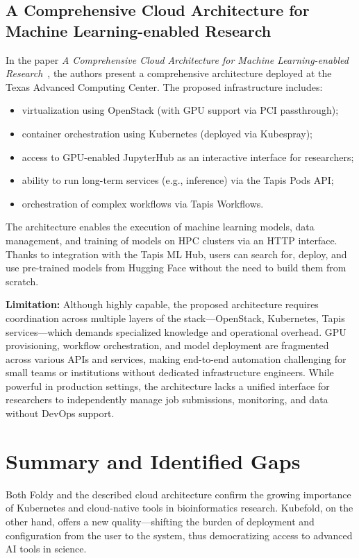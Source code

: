 \subsection{A Comprehensive Cloud Architecture for Machine Learning-enabled Research}

In the paper \textit{A Comprehensive Cloud Architecture for Machine Learning-enabled Research}~\cite{cloud_architecture_for_research}, the authors present a comprehensive architecture deployed at the Texas Advanced Computing Center.
The proposed infrastructure includes:
\begin{itemize}
    \item virtualization using OpenStack (with GPU support via PCI passthrough);
    \item container orchestration using Kubernetes (deployed via Kubespray);
    \item access to GPU-enabled JupyterHub as an interactive interface for researchers;
    \item ability to run long-term services (e.g., inference) via the Tapis Pods API;
    \item orchestration of complex workflows via Tapis Workflows.
\end{itemize}

The architecture enables the execution of machine learning models, data management, and training of models on HPC clusters via an HTTP interface.
Thanks to integration with the Tapis ML Hub, users can search for, deploy, and use pre-trained models from Hugging Face without the need to build them from scratch.

\textbf{Limitation:} Although highly capable, the proposed architecture requires coordination across multiple layers of the stack—OpenStack, Kubernetes, Tapis services—which demands specialized knowledge and operational overhead.
GPU provisioning, workflow orchestration, and model deployment are fragmented across various APIs and services, making end-to-end automation challenging for small teams or institutions without dedicated infrastructure engineers.
While powerful in production settings, the architecture lacks a unified interface for researchers to independently manage job submissions, monitoring, and data without DevOps support.


\section{Summary and Identified Gaps}

Both Foldy and the described cloud architecture confirm the growing importance of Kubernetes and cloud-native tools in bioinformatics research.
Kubefold, on the other hand, offers a new quality—shifting the burden of deployment and configuration from the user to the system, thus democratizing access to advanced AI tools in science.

